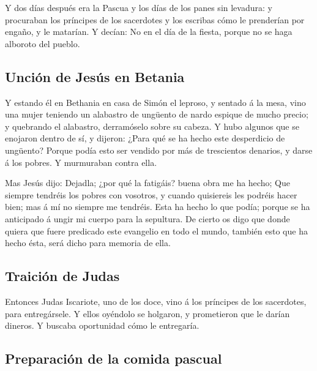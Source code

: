  Y dos días después era la Pascua y los días de los panes
sin levadura: y procuraban los príncipes de los sacerdotes y los
escribas cómo le prenderían por engaño, y le matarían.  Y
decían: No en el día de la fiesta, porque no se haga alboroto del
pueblo.

\hypertarget{unciuxf3n-de-jesuxfas-en-betania}{%
\subsection{Unción de Jesús en
Betania}\label{unciuxf3n-de-jesuxfas-en-betania}}

 Y estando él en Bethania en casa de Simón el leproso, y
sentado á la mesa, vino una mujer teniendo un alabastro de ungüento de
nardo espique de mucho precio; y quebrando el alabastro, derramóselo
sobre su cabeza.  Y hubo algunos que se enojaron dentro de
sí, y dijeron: ¿Para qué se ha hecho este desperdicio de ungüento?
 Porque podía esto ser vendido por más de trescientos
denarios, y darse á los pobres. Y murmuraban contra ella.

 Mas Jesús dijo: Dejadla; ¿por qué la fatigáis? buena obra
me ha hecho;  Que siempre tendréis los pobres con
vosotros, y cuando quisiereis les podréis hacer bien; mas á mí no
siempre me tendréis.  Esta ha hecho lo que podía; porque
se ha anticipado á ungir mi cuerpo para la sepultura.  De
cierto os digo que donde quiera que fuere predicado este evangelio en
todo el mundo, también esto que ha hecho ésta, será dicho para memoria
de ella.

\hypertarget{traiciuxf3n-de-judas}{%
\subsection{Traición de Judas}\label{traiciuxf3n-de-judas}}

 Entonces Judas Iscariote, uno de los doce, vino á los
príncipes de los sacerdotes, para entregársele.  Y ellos
oyéndolo se holgaron, y prometieron que le darían dineros. Y buscaba
oportunidad cómo le entregaría.

\hypertarget{preparaciuxf3n-de-la-comida-pascual}{%
\subsection{Preparación de la comida
pascual}\label{preparaciuxf3n-de-la-comida-pascual}}


